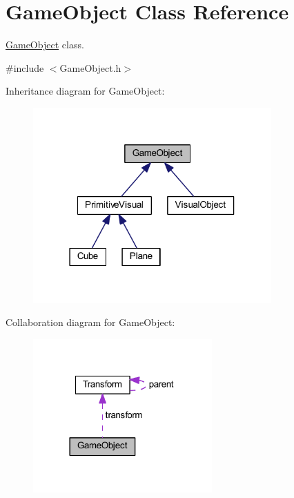 \hypertarget{class_game_object}{}\section{Game\+Object Class Reference}
\label{class_game_object}


\mbox{\hyperlink{class_game_object}{Game\+Object}} class.  




{\ttfamily \#include $<$Game\+Object.\+h$>$}



Inheritance diagram for Game\+Object\+:\nopagebreak
\begin{figure}[H]
\begin{center}
\leavevmode
\includegraphics[width=259pt]{class_game_object__inherit__graph}
\end{center}
\end{figure}


Collaboration diagram for Game\+Object\+:\nopagebreak
\begin{figure}[H]
\begin{center}
\leavevmode
\includegraphics[width=194pt]{class_game_object__coll__graph}
\end{center}
\end{figure}
